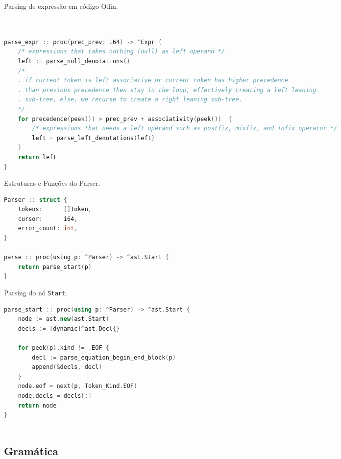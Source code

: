 \begin{codigo}[H]
  \caption{\small Parsing de expressão em código Odin.}
        \label{alg-pratt-parsing}
  \begin{lstlisting}[language=C]


parse_expr :: proc(prec_prev: i64) -> ^Expr {
    /* expressions that takes nothing (null) as left operand */
    left := parse_null_denotations()
    /*
    . if current token is left associative or current token has higher precedence
    . than previous precedence then stay in the loop, effectively creating a left leaning
    . sub-tree, else, we recurse to create a right leaning sub-tree.
    */
    for precedence(peek()) > prec_prev + associativity(peek())  {
        /* expressions that needs a left operand such as postfix, mixfix, and infix operator */
        left = parse_left_denotations(left)
    }
    return left
}


  \end{lstlisting}
\end{codigo}

\begin{codigo}[htb]
        \caption{\small Estruturas e Funções do Parser. }
        \label{cod-func-and-structs}
  \begin{lstlisting}[language = C]
Parser :: struct {
    tokens:      []Token,
    cursor:      i64,
    error_count: int,
}

parse :: proc(using p: ^Parser) -> ^ast.Start {
    return parse_start(p)
}
  \end{lstlisting}
\end{codigo}

\begin{codigo}[htb]
    \caption{\small Parsing do nó \texttt{Start}. }
        \label{cod-parsing-start}
  \begin{lstlisting}[language=C++]
parse_start :: proc(using p: ^Parser) -> ^ast.Start {
    node := ast.new(ast.Start)
    decls := [dynamic]^ast.Decl{}

    for peek(p).kind != .EOF {
        decl := parse_equation_begin_end_block(p)
        append(&decls, decl)
    }
    node.eof = next(p, Token_Kind.EOF)
    node.decls = decls[:]
    return node
}
    
  \end{lstlisting}
\end{codigo}



\subsection{Gramática}

